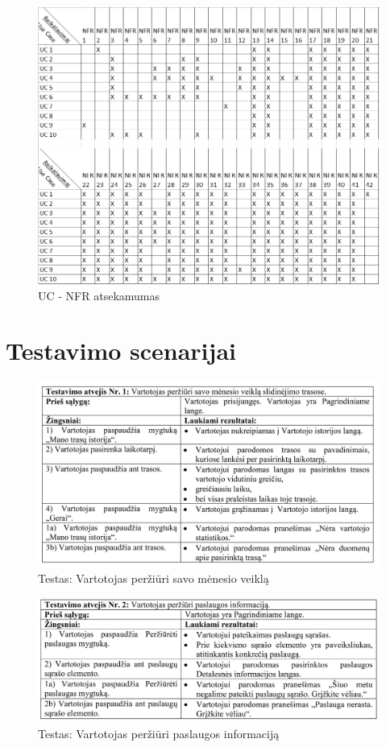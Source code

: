 \documentclass[oneside]{VUMIFPSkursinis}
\begin{document}
	\begin{figure}[h]
    				\centering
    				\includegraphics[width=1\textwidth]{UC_NFR.png}
    				\caption{UC - NFR atsekamumas}
			\end{figure}
\section{Testavimo scenarijai}
	
			\begin{figure}[h]
    				\centering
    				\includegraphics[width=1\textwidth]{test1.png}
    				\caption{Testas: Vartotojas peržiūri savo mėnesio veiklą}
    				\label{fig:Testas: Vartotojas peržiūri savo mėnesio veiklą}
			\end{figure}
			
			\begin{figure}[h]
    				\centering
    				\includegraphics[width=1\textwidth]{test2.png}
    				\caption{Testas: Vartotojas peržiūri paslaugos informaciją}
    				\label{fig:Testas: Vartotojas peržiūri paslaugos informaciją}
			\end{figure}
			
\end{document}
